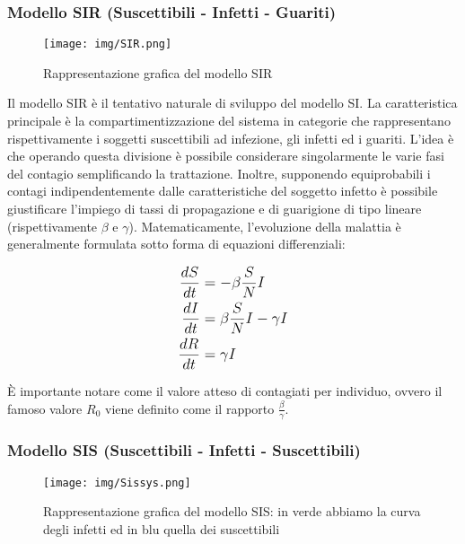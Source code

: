 \documentclass[12pt,twoside]{report}
\begin{document}
\subsubsection{Modello SIR (Suscettibili - Infetti - Guariti)}

\vskip 20pt
	\begin{figure}[h]
		\centering
		\texttt{[image: img/SIR.png]}
		\caption{Rappresentazione grafica del modello SIR}\label{fig:1}
	\end{figure}

    Il modello SIR è il tentativo naturale di sviluppo del modello SI. La caratteristica principale è la compartimentizzazione del sistema in categorie che rappresentano rispettivamente i soggetti suscettibili ad infezione, gli infetti ed i guariti.
    L'idea è che operando questa divisione è possibile considerare singolarmente le varie fasi del contagio semplificando la trattazione. Inoltre, supponendo equiprobabili i contagi indipendentemente dalle caratteristiche del soggetto infetto è possibile giustificare l'impiego di tassi di propagazione e di guarigione di tipo lineare (rispettivamente $\beta$ e $\gamma$). Matematicamente, l'evoluzione della malattia è generalmente formulata sotto forma di equazioni differenziali:
    
    \begin{subequations}
    \label{eq1}
    \large
        \begin{align}
            \frac{dS}{dt} & = -\beta \frac{S}{N} I \label{eq11} 
            \\
            \frac{dI}{dt} & = \beta \frac{S}{N} I - \gamma I \label{eq12}
            \\
            \frac{dR}{dt} & = \gamma I \label{eq13}
        \end{align}
    \end{subequations}

    È importante notare come il valore atteso di contagiati per individuo, ovvero il famoso valore $R_0$ viene definito come il rapporto  $\frac{\beta}{\gamma}$.\clearpage
    
    \subsubsection{Modello SIS (Suscettibili - Infetti - Suscettibili)}
    \begin{figure}[h]
		\centering
		\texttt{[image: img/Sissys.png]}
		\caption{Rappresentazione grafica del modello SIS: in verde abbiamo la curva degli infetti ed in blu quella dei suscettibili}\label{fig:1}
	\end{figure}
	
\end{document}
